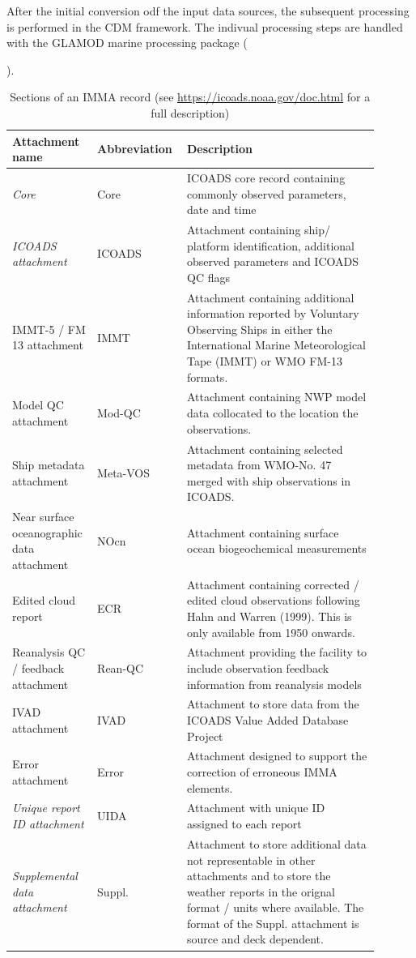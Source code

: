 After the initial conversion odf the input data sources, the subsequent processing is performed in the CDM framework.
The indivual processing steps are handled with the GLAMOD marine processing package ({\cite{lierhammer_2024_14215566}).


\begin{table}
\centering
\caption{Sections of an IMMA record (see \url{https://icoads.noaa.gov/doc.html} for a full description)}
\label{tab:imma_structure}
\begin{tabular}{|p{0.2\linewidth}|p{0.2\linewidth}|p{0.5\linewidth}|}
\hline
\bfseries Attachment name & \bfseries Abbreviation & \bfseries Description \\
\hline
\it Core & Core & ICOADS core record containing commonly observed parameters, date and time\\\hline
\it ICOADS attachment & ICOADS & Attachment containing ship/ platform identification, additional observed parameters and ICOADS QC flags \\\hline
IMMT-5 / FM 13 attachment & IMMT & Attachment containing additional information reported by Voluntary Observing Ships in either the International Marine Meteorological Tape (IMMT) or WMO FM-13 formats. \\\hline
Model QC attachment & Mod-QC & Attachment containing NWP model data collocated to the location the observations. \\\hline
Ship metadata attachment & Meta-VOS & Attachment containing selected metadata from WMO-No. 47 merged with ship observations in ICOADS. \\\hline
Near surface oceanographic data attachment & NOcn & Attachment containing surface ocean biogeochemical measurements \\\hline
Edited cloud report & ECR & Attachment containing corrected / edited cloud observations following Hahn and Warren (1999). This is only available from 1950 onwards. \\\hline
Reanalysis QC / feedback attachment & Rean-QC & Attachment providing the facility to include observation feedback information from reanalysis models \\\hline
IVAD attachment & IVAD & Attachment to store data from the ICOADS Value Added Database Project \\\hline
Error attachment & Error & Attachment designed to support the correction of erroneous IMMA elements. \\\hline
\it Unique report ID attachment & UIDA & Attachment with unique ID assigned to each report \\\hline
\it Supplemental data attachment & Suppl. & Attachment to store additional data not representable in other attachments and to store the weather reports in the orignal format / units where available. The format of the Suppl. attachment is source and deck dependent.\\\hline
\end{tabular}
\end{table}

}
